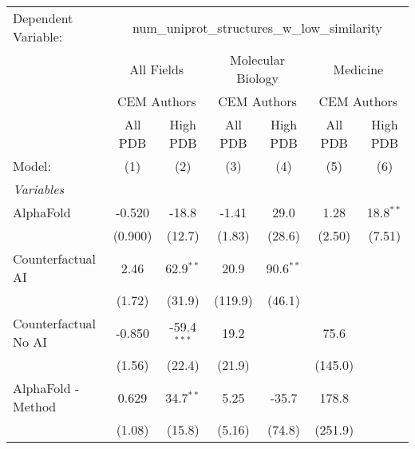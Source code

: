 \begingroup
\centering
\begin{tabular}{lcccccc}
   \tabularnewline \midrule \midrule
   Dependent Variable: & \multicolumn{6}{c}{num\_uniprot\_structures\_w\_low\_similarity}\\
 & \multicolumn{2}{c}{All Fields} & \multicolumn{2}{c}{Molecular Biology} & \multicolumn{2}{c}{Medicine} \\
\cmidrule(lr){2-3} \cmidrule(lr){4-5} \cmidrule(lr){6-7}
 & \multicolumn{2}{c}{CEM Authors} & \multicolumn{2}{c}{CEM Authors} & \multicolumn{2}{c}{CEM Authors} \\
\cmidrule(lr){2-3} \cmidrule(lr){4-5} \cmidrule(lr){6-7}
 & \multicolumn{1}{c}{All PDB} & \multicolumn{1}{c}{High PDB} & \multicolumn{1}{c}{All PDB} & \multicolumn{1}{c}{High PDB} & \multicolumn{1}{c}{All PDB} & \multicolumn{1}{c}{High PDB} \\
\cmidrule(lr){2-2} \cmidrule(lr){3-3} \cmidrule(lr){4-4} \cmidrule(lr){5-5} \cmidrule(lr){6-6} \cmidrule(lr){7-7}
   Model:                                                  & (1)         & (2)           & (3)        & (4)         & (5)     & (6)\\  
   \midrule
   \emph{Variables}\\
   AlphaFold                                               & -0.520      & -18.8         & -1.41      & 29.0        & 1.28    & 18.8$^{**}$\\   
                                                           & (0.900)     & (12.7)        & (1.83)     & (28.6)      & (2.50)  & (7.51)\\   
   Counterfactual AI                                       & 2.46        & 62.9$^{**}$   & 20.9       & 90.6$^{**}$ &         &   \\   
                                                           & (1.72)      & (31.9)        & (119.9)    & (46.1)      &         &   \\   
   Counterfactual No AI                                    & -0.850      & -59.4$^{***}$ & 19.2       &             & 75.6    &   \\   
                                                           & (1.56)      & (22.4)        & (21.9)     &             & (145.0) &   \\   
   AlphaFold - Method                                      & 0.629       & 34.7$^{**}$   & 5.25       & -35.7       & 178.8   &   \\   
                                                           & (1.08)      & (15.8)        & (5.16)     & (74.8)      & (251.9) &   \\   

\end{tabular}
